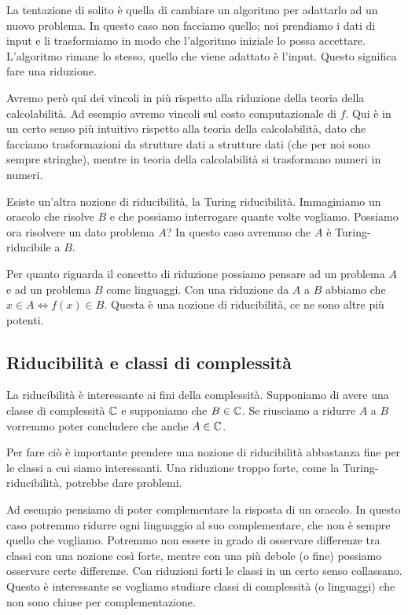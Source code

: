 La tentazione di solito è quella di cambiare un algoritmo per adattarlo ad un nuovo problema. In
questo caso non facciamo quello; noi prendiamo i dati di input e li trasformiamo in modo che
l'algoritmo iniziale lo possa accettare. L'algoritmo rimane lo stesso, quello che viene adattato è
l'input. Questo significa fare una riduzione.

Avremo però qui dei vincoli in più rispetto alla riduzione della teoria della calcolabilità. Ad
esempio avremo vincoli sul costo computazionale di $f$. Qui è in un certo senso più intuitivo
rispetto alla teoria della calcolabilità, dato che facciamo trasformazioni da strutture dati a
strutture dati (che per noi sono sempre stringhe), mentre in teoria della calcolabilità si
trasformano numeri in numeri.

Esiste un'altra nozione di riducibilità, la Turing riducibilità. Immaginiamo un oracolo che risolve
$B$ e che possiamo interrogare quante volte vogliamo. Possiamo ora risolvere un dato problema $A$?
In questo caso avremmo che $A$ è Turing-riducibile a $B$.

Per quanto riguarda il concetto di riduzione possiamo pensare ad un problema $A$ e ad un problema
$B$ come linguaggi. Con una riduzione da $A$ a $B$ abbiamo che $x \in A \iff f(x) \in B$. Questa è una
nozione di riducibilità, ce ne sono altre più potenti.

\subsection{Riducibilità e classi di complessità}

La riducibilità è interessante ai fini della complessità. Supponiamo di avere una classe di
complessità $\mathbb{C}$ e supponiamo che $B \in \mathbb{C}$. Se riusciamo a ridurre $A$ a $B$ vorremmo
poter concludere che anche $A \in \mathbb{C}$.

Per fare ciò è importante prendere una nozione di riducibilità abbastanza fine per le classi a
cui siamo interessanti. Una riduzione troppo forte, come la Turing-riducibilità, potrebbe dare
problemi.

Ad esempio pensiamo di poter complementare la risposta di un oracolo. In questo caso potremmo
ridurre ogni linguaggio al suo complementare, che non è sempre quello che vogliamo. Potremmo non
essere in grado di osservare differenze tra classi con una nozione così forte, mentre con una più
debole (o fine) possiamo osservare certe differenze. Con riduzioni forti le classi in un certo senso
collassano. Questo è interessante se vogliamo studiare classi di complessità (o linguaggi) che non
sono chiuse per complementazione.

